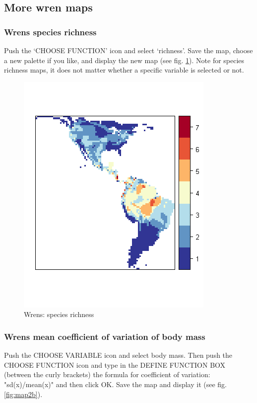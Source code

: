 \documentclass[ a4paper ]{article}
\begin{document}
	
	\subsection{ More wren maps}
		\subsubsection{Wrens species richness}
Push the `CHOOSE FUNCTION' icon and select `richness'. Save the map, choose a new palette if you like, and display the new map (see fig. \ref{fig:map2c}). Note for species richness maps, it does not matter whether a specific variable is selected or not.
	
\begin{figure}[htbp]
  \begin{center}
	\includegraphics[width=0.5\linewidth]{map2c}
    \caption{\label{fig:map2c} Wrens: species richness}
  \end{center}
\end{figure}	
	
	
	\subsubsection{Wrens mean coefficient of variation  of body mass}
	\label{sec:wrensCV}

	Push the CHOOSE VARIABLE icon and select body mass. Then push the CHOOSE FUNCTION icon and type in the DEFINE FUNCTION BOX (between the curly brackets) the formula for coefficient of variation: "sd(x)/mean(x)" and then click OK. Save the map and display it (see fig. \ref{fig:map2b}).
	
\end{document}
